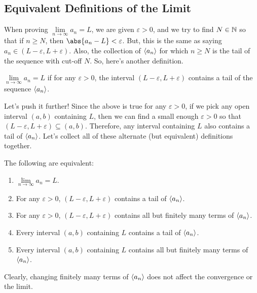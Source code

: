 \subsection*{Equivalent Definitions of the Limit}
When proving $ \lim\limits_{{n} \to {\infty}}a_n=L $, we are given $ \varepsilon>0 $, and we try to find $ N\in\mathbb{N} $
so that if $ n\ge N $, then $ \abs{a_n-L}<\varepsilon $. But, this is the same as saying
$ a_n\in (L-\varepsilon,L+\varepsilon) $. Also, the collection of $ \langle a_n\rangle $ for which
$ n\ge N $ is the tail of the sequence with cut-off $ N $. So, here's another definition.
\begin{Definition}{}{}
    $ \lim\limits_{{n} \to {\infty}}a_n=L $ if for any $ \varepsilon>0 $, the interval
    $ (L-\varepsilon,L+\varepsilon) $ contains a tail of the sequence $ \langle a_n\rangle $.
\end{Definition}
Let's push it further! Since the above is true for any $ \varepsilon>0 $, if we pick any
open interval $ (a,b) $ containing $ L $, then we can find a small enough $ \varepsilon>0 $
so that $ (L-\varepsilon,L+\varepsilon)\subseteq (a,b) $. Therefore, any interval containing
$ L $ also contains a tail of $ \langle a_n\rangle $. Let's collect all of these alternate (but equivalent) definitions together.
\begin{Theorem}{}{}
    The following are equivalent:
    \begin{enumerate}[(1)]
        \item $ \lim\limits_{{n} \to {\infty}}a_n=L $.
        \item For any $ \varepsilon>0 $, $ (L-\varepsilon,L+\varepsilon) $ contains a tail of $ \langle a_n\rangle $.
        \item For any $ \varepsilon>0 $, $ (L-\varepsilon,L+\varepsilon) $ contains all but finitely many terms of $ \langle a_n\rangle $.
        \item Every interval $ (a,b) $ containing $ L $ contains a tail of $ \langle a_n\rangle $.
        \item Every interval $ (a,b) $ containing $ L $ contains all but finitely many terms of $ \langle a_n\rangle $.
    \end{enumerate}
    Clearly, changing finitely many terms of $ \langle a_n\rangle $ does not affect the convergence or the limit.
\end{Theorem}
